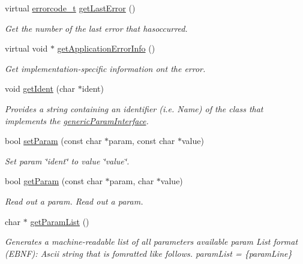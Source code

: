 \begin{DoxyCompactItemize}
virtual \hyperlink{classhe2mt_s_d_i_aa527ccf96fd5eacc154c1c23e56fc9fd}{errorcode\-\_\-t} \hyperlink{classhe2mt_s_d_i_rest_acaf62f7b38b6c855465c2059d106ee21}{get\-Last\-Error} ()
\begin{DoxyCompactList}\small\item\em Get the number of the last error that hasoccurred. \end{DoxyCompactList}\item 
virtual void $\ast$ \hyperlink{classhe2mt_s_d_i_rest_a0adf7ecd30a44528631e374ec5822a29}{get\-Application\-Error\-Info} ()
\begin{DoxyCompactList}\small\item\em Get implementation-\/specific information ont the error. \end{DoxyCompactList}\item 
void \hyperlink{classhe2mt_s_d_i_rest_a2f34f8612953d2c1402bc2ddaf0ed3e9}{get\-Ident} (char $\ast$ident)
\begin{DoxyCompactList}\small\item\em Provides a string containing an identifier (i.\-e. Name) of the class that implements the \hyperlink{classgeneric_param_interface}{generic\-Param\-Interface}. \end{DoxyCompactList}\item 
bool \hyperlink{classhe2mt_s_d_i_rest_a2d5f9bf0e405bce69baf6486409c4ad5}{set\-Param} (const char $\ast$param, const char $\ast$value)
\begin{DoxyCompactList}\small\item\em Set param \char`\"{}ident\char`\"{} to value \char`\"{}value\char`\"{}. \end{DoxyCompactList}\item 
bool \hyperlink{classhe2mt_s_d_i_rest_a4c351a302baa5e698b45836f4ddb948c}{get\-Param} (const char $\ast$param, char $\ast$value)
\begin{DoxyCompactList}\small\item\em Read out a param. Read out a param. \end{DoxyCompactList}\item 
char $\ast$ \hyperlink{classhe2mt_s_d_i_rest_a94793e0a2d3a3f190430c14d5571c6a3}{get\-Param\-List} ()
\begin{DoxyCompactList}\small\item\em Generates a machine-\/readable list of all parameters available param List format (E\-B\-N\-F)\-: Ascii string that is fomratted like follows. param\-List = \{param\-Line\}\par

\end{DoxyCompactList}
\end{DoxyCompactItemize}

